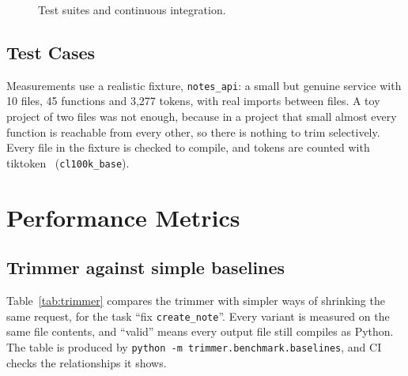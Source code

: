 \documentclass[12pt, a4paper, oneside]{report}
\newcommand{\code}[1]{\texttt{#1}}
\begin{document}
\begin{figure}[H]
\centering
{}
\caption{Test suites and continuous integration.}
\label{fig:testing}
\end{figure}

\subsection{Test Cases}



Measurements use a realistic fixture, \code{notes\_api}: a small but genuine
service with 10 files, 45 functions and 3,277 tokens, with real imports between
files. A toy project of two files was not enough, because in a project that small
almost every function is reachable from every other, so there is nothing to trim
selectively. Every file in the fixture is checked to compile, and tokens are
counted with tiktoken~\cite{tiktoken} (\code{cl100k\_base}).

\section{Performance Metrics}

\subsection{Trimmer against simple baselines}

Table~\ref{tab:trimmer} compares the trimmer with simpler ways of shrinking the
same request, for the task ``fix \code{create\_note}''. Every variant is measured
on the same file contents, and ``valid'' means every output file still compiles
as Python. The table is produced by \code{python -m trimmer.benchmark.baselines},
and CI checks the relationships it shows.
\end{document}

